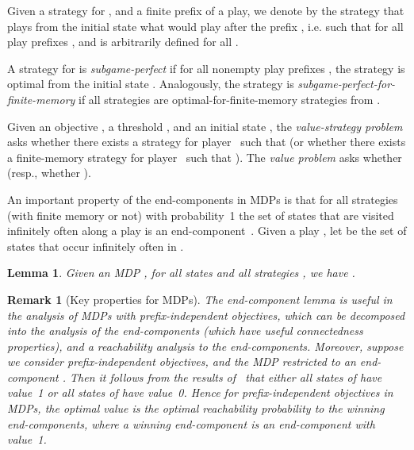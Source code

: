 \documentclass{article}
\newtheorem{lemma}{Lemma}
\newtheorem{remark}{Remark}
\begin{document}
\smallskip{}
Given a strategy  for , and a finite prefix  
of a play, we denote by  the strategy that plays from the initial 
state  what  would play after the prefix , i.e. such that
 for all play prefixes , 
and  is arbitrarily defined for all .

A strategy  for  is \emph{subgame-perfect} if for all nonempty play 
prefixes , the strategy  is optimal from the initial 
state .
Analogously, the strategy  is \emph{subgame-perfect-for-finite-memory}
if all strategies  are optimal-for-finite-memory strategies 
from .




\smallskip{}
Given an objective , a threshold , and an initial state , 
the \emph{value-strategy problem} 
asks whether there exists a strategy  for player~
such that  (or whether there exists a finite-memory 
strategy  for player~ such that ).
The \emph{value problem} asks whether  (resp., whether
).



\smallskip{}
An important property of the end-components in MDPs is that for all 
strategies (with finite memory or not) with probability~1 the set
of states that are visited infinitely often along a play is
an end-component~\cite{CY95,deAlfaro97}. 
Given a play , let  be the set of states 
that occur infinitely often in .

\begin{lemma}\label{lem:end-component}
  \cite{CY95,deAlfaro97} Given an MDP , for all states 
  and all strategies , we have
  .
\end{lemma}


\begin{remark}[Key properties for MDPs]\label{rem:key}
The end-component lemma is useful in the analysis of MDPs with 
prefix-independent objectives, which can be decomposed into the analysis of the 
end-components (which have useful connectedness properties), 
and a reachability analysis to the end-components.
Moreover, suppose we consider prefix-independent objectives, and the 
MDP restricted to an end-component . 
Then it follows from the results of~\cite{Cha07b} that either all states of  
have value~1 or all states of  have value~0. 
Hence for prefix-independent objectives in MDPs, the optimal value is the optimal 
reachability probability to the {\em winning} end-components, where a
winning end-component is an end-component with value~1.
\end{remark}
\end{document}

